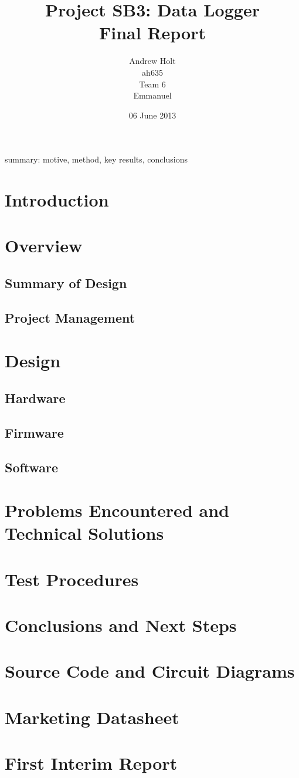 \documentclass[a4paper,11pt]{article}  %
\title{Project SB3: Data Logger\\
       Final Report}
\author{Andrew Holt\\
        ah635\\
        Team 6\\
        Emmanuel}
\date{06 June 2013}
\begin{document}
\maketitle

summary: motive, method, key results, conclusions

\tableofcontents

\section{Introduction}

\section{Overview}

\subsection{Summary of Design}

\subsection{Project Management}

\section{Design}

\subsection{Hardware}

\subsection{Firmware}

\subsection{Software}

\section{Problems Encountered and Technical Solutions}

\section{Test Procedures}

\section{Conclusions and Next Steps}

\appendix

\section{Source Code and Circuit Diagrams}

\section{Marketing Datasheet}

\section{First Interim Report}
\end{document}
